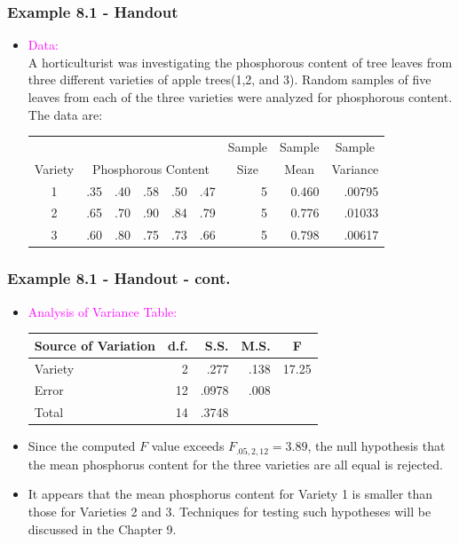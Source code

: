 \documentclass[xcolor=dvipsnames,12pt]{beamer}
\begin{document}
\begin{frame}
\frametitle{Example 8.1 - Handout}
\begin{itemize}
\item \textcolor{magenta}{Data:}\\[.1in]
A horticulturist was investigating the phosphorous content of tree leaves from three different varieties of apple trees(1,2, and 3). Random samples of five leaves from each of the three varieties were analyzed for 
phosphorous content. The data are:\\[.1in]
\begin{small}
\begin{center}
 \begin{tabular}{crrrrrrrr} \hline
 &  &  & & & &  \multicolumn{1}{c}{Sample} &  \multicolumn{1}{c}{Sample} &  \multicolumn{1}{c}{Sample}\\
 \multicolumn{1}{c}{Variety} & \multicolumn{5}{c}{Phosphorous Content} &
 \multicolumn{1}{c}{Size} &  \multicolumn{1}{c}{Mean} &  \multicolumn{1}{c}{Variance}\\ \hline
 1 & .35 & .40 & .58 & .50 & .47 & 5 & 0.460 & .00795 \\
 2 & .65 & .70 & .90 & .84 & .79 & 5 & 0.776 & .01033 \\
 3 & .60 & .80 & .75 & .73 & .66 & 5 & 0.798 & .00617 \\ \hline
\end{tabular}
\end{center}
\end{small}
\end{itemize}
\end{frame}



\begin{frame}
\frametitle{Example 8.1 - Handout - cont.}
\begin{itemize}
\item \textcolor{magenta} {Analysis of Variance Table:}
\begin{small}
\begin{center}
\begin{tabular}{lrrrc} 
Source of Variation & d.f. & S.S. & M.S. & F \\ \hline
Variety & 2& .277  & .138 & 17.25 \\
Error & 12 & .0978 & .008 & \\ \hline
Total & 14 & .3748
\end{tabular}
\end{center}
\end{small}
\item Since the computed $F$ value exceeds
$F_{.05,2,12} = 3.89$, the null hypothesis that the  mean phosphorus content for the three varieties
are all equal is rejected. 
\item It appears that the mean phosphorus content for Variety 1 is smaller than those for Varieties 2 and 3.
Techniques for testing such  hypotheses will be discussed in the Chapter 9.
\end{itemize}
\end{frame}
\end{document}
